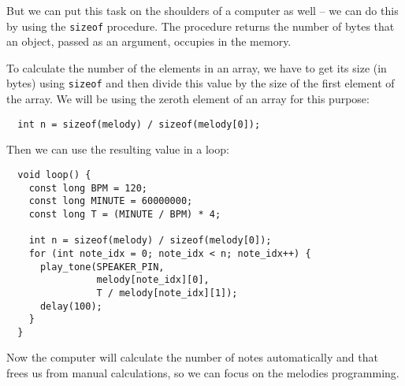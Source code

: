 \documentclass[../sparc.tex]{subfiles}
\begin{document}
But we can put this task on the shoulders of a computer as well -- we can do this
by using the \texttt{sizeof} procedure.  The procedure returns the number of
bytes that an object, passed as an argument, occupies in the memory.

To calculate the number of the elements in an array, we have to get its size (in
bytes) using \texttt{sizeof} and then divide this value by the size of the first
element of the array.  We will be using the zeroth element of an array for this
purpose:

\begin{verbatim}
  int n = sizeof(melody) / sizeof(melody[0]);
\end{verbatim}

Then we can use the resulting value in a loop:

\begin{verbatim}
  void loop() {
    const long BPM = 120;
    const long MINUTE = 60000000;
    const long T = (MINUTE / BPM) * 4;

    int n = sizeof(melody) / sizeof(melody[0]);
    for (int note_idx = 0; note_idx < n; note_idx++) {
      play_tone(SPEAKER_PIN,
                melody[note_idx][0],
                T / melody[note_idx][1]);
      delay(100);
    }
  }
\end{verbatim}

Now the computer will calculate the number of notes automatically and that frees
us from manual calculations, so we can focus on the melodies programming.
\end{document}
